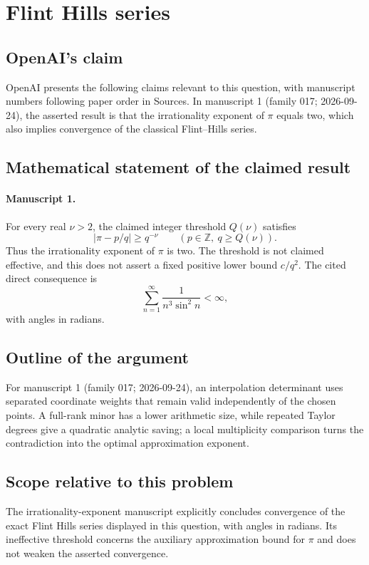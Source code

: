 \documentclass[11pt]{article}
\begin{document}
\section*{Flint Hills series}

\subsection{OpenAI's claim}
OpenAI presents the following claims relevant to this question, with manuscript numbers following paper order in Sources. In manuscript 1 (family 017; 2026-09-24), the asserted result is that the irrationality exponent of $\pi$ equals two, which also implies convergence of the classical Flint--Hills series.

\subsection{Mathematical statement of the claimed result}
\paragraph{Manuscript 1.}
For every real $\nu>2$, the claimed integer threshold $Q(\nu)$ satisfies
\[
 |\pi-p/q|\ge q^{-\nu}\qquad(p\in\mathbb Z,\ q\ge Q(\nu)).
\]
Thus the irrationality exponent of $\pi$ is two. The threshold is not claimed effective, and this does not assert a fixed positive lower bound $c/q^2$. The cited direct consequence is
\[
 \sum_{n=1}^{\infty}\frac1{n^3\sin^2 n}<\infty,
\]
with angles in radians.

\subsection{Outline of the argument}
For manuscript 1 (family 017; 2026-09-24), an interpolation determinant uses separated coordinate weights that remain valid independently of the chosen points. A full-rank minor has a lower arithmetic size, while repeated Taylor degrees give a quadratic analytic saving; a local multiplicity comparison turns the contradiction into the optimal approximation exponent.

\subsection{Scope relative to this problem}
The irrationality-exponent manuscript explicitly concludes convergence of the exact Flint Hills series displayed in this question, with angles in radians. Its ineffective threshold concerns the auxiliary approximation bound for $\pi$ and does not weaken the asserted convergence.
\end{document}
